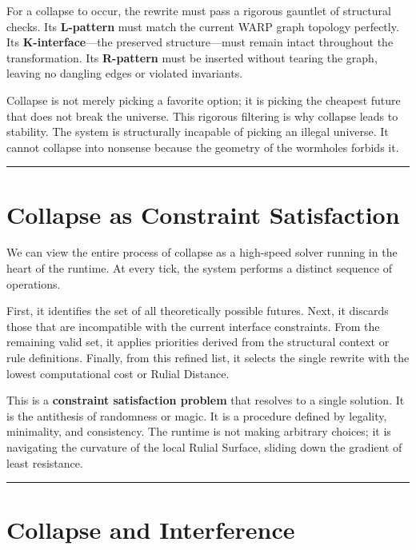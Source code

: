 For a collapse to occur, the rewrite must pass a rigorous gauntlet of structural checks. Its \textbf{L-pattern} must match the current WARP graph topology perfectly. Its \textbf{K-interface}—the preserved structure—must remain intact throughout the transformation. Its \textbf{R-pattern} must be inserted without tearing the graph, leaving no dangling edges or violated invariants.

Collapse is not merely picking a favorite option; it is picking the cheapest future that does not break the universe. This rigorous filtering is why collapse leads to stability. The system is structurally incapable of picking an illegal universe. It cannot collapse into nonsense because the geometry of the wormholes forbids it.

\begin{center}\rule{0.5\linewidth}{0.5pt}\end{center}

\section{\texorpdfstring{\textbf{Collapse as Constraint Satisfaction}}{13.5 --- Collapse as Constraint Satisfaction}}

We can view the entire process of collapse as a high-speed solver running in the heart of the runtime. At every tick, the system performs a distinct sequence of operations.

First, it identifies the set of all theoretically possible futures. Next, it discards those that are incompatible with the current interface constraints. From the remaining valid set, it applies priorities derived from the structural context or rule definitions. Finally, from this refined list, it selects the single rewrite with the lowest computational cost or Rulial Distance.

This is a \textbf{constraint satisfaction problem} that resolves to a single solution. It is the antithesis of randomness or magic. It is a procedure defined by legality, minimality, and consistency. The runtime is not making arbitrary choices; it is navigating the curvature of the local Rulial Surface, sliding down the gradient of least resistance.

\begin{center}\rule{0.5\linewidth}{0.5pt}\end{center}

\section{\texorpdfstring{\textbf{Collapse and Interference}}{13.6 --- Collapse and Interference}}


